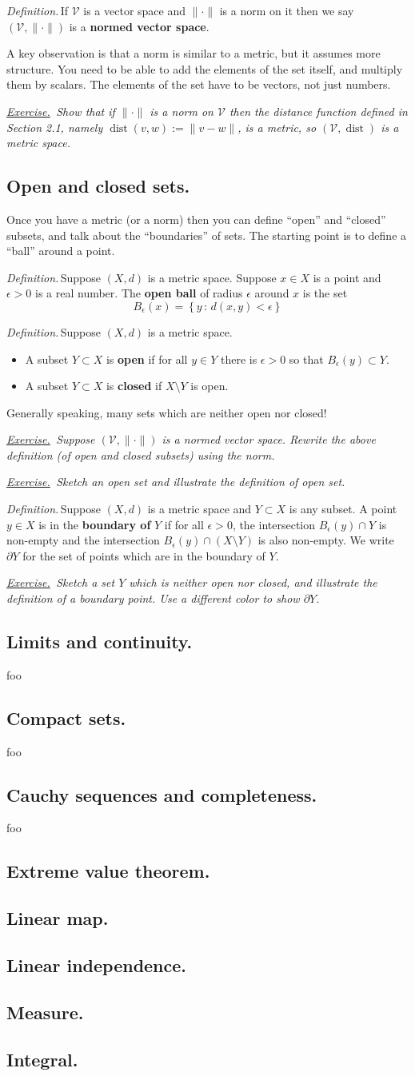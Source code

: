 \documentclass[12pt]{article}
\newcommand{\cV}{\mathcal{V}}
\newcommand{\eps}{\epsilon}
\newcommand{\sect}[1]{\subsection*{#1.}}
\newcommand{\defin}{\emph{Definition.}\,}
\newcommand{\exer}[2]{\emph{\underline{Exercise.}\, #2} \vspace*{#1mm}}
\begin{document}
\defin If $\cV$ is a vector space and $\|\cdot\|$ is a norm on it then we say $(\cV,\|\cdot\|)$ is a \textbf{normed vector space}.

A key observation is that a norm is similar to a metric, but it assumes more structure.  You need to be able to add the elements of the set itself, and multiply them by scalars.  The elements of the set have to be vectors, not just numbers.

\exer{50}{Show that if $\|\cdot\|$ is a norm on $\cV$ then the distance function defined in Section 2.1, namely $\operatorname{dist}(v,w) := \|v-w\|$, is a metric, so $(\cV,\operatorname{dist})$ is a metric space.}


\sect{Open and closed sets}

Once you have a metric (or a norm) then you can define ``open'' and ``closed'' subsets, and talk about the ``boundaries'' of sets.  The starting point is to define a ``ball'' around a point.

\defin Suppose $(X,d)$ is a metric space.  Suppose $x\in X$ is a point and $\eps>0$ is a real number.  The \textbf{open ball} of radius $\eps$ around $x$ is the set
	$$B_\eps(x) = \left\{y\,:\,d(x,y) < \eps\right\}$$ 

\defin Suppose $(X,d)$ is a metric space.
\begin{itemize}
\item A subset $Y\subset X$ is \textbf{open} if for all $y\in Y$ there is $\eps>0$ so that $B_\eps(y) \subset Y$.
\item A subset $Y\subset X$ is \textbf{closed} if $X \setminus Y$ is open.
\end{itemize}

Generally speaking, many sets which are neither open nor closed!

\exer{60}{Suppose $(\cV,\|\cdot\|)$ is a normed vector space.  Rewrite the above definition (of open and closed subsets) using the norm.}

\exer{60}{Sketch an open set and illustrate the definition of open set.}

\clearpage\newpage
\defin Suppose $(X,d)$ is a metric space and $Y \subset X$ is any subset.  A point $y\in X$ is in the \textbf{boundary of } $Y$ if for all $\eps>0$, the intersection $B_\eps(y)\cap Y$ is non-empty and the intersection $B_\eps(y)\cap (X\setminus Y)$ is also non-empty.  We write $\partial Y$ for the set of points which are in the boundary of $Y$.

\exer{60}{Sketch a set $Y$ which is neither open nor closed, and illustrate the definition of a boundary point.  Use a different color to show $\partial Y$.}


\sect{Limits and continuity}

foo


\sect{Compact sets}

foo


\sect{Cauchy sequences and completeness}

foo


\sect{Extreme value theorem}

\sect{Linear map}

\sect{Linear independence}

\sect{Measure}

\sect{Integral}
\end{document}
